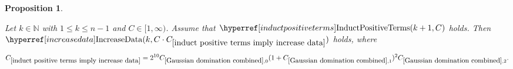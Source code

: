 \documentclass[12pt,reqno]{amsart}
\theoremstyle{plain}
\newtheorem{proposition}[theorem]{Proposition}
\numberwithin{equation}{section}
\theoremstyle{remark}
\newcommand{\uses}[1]{}
\newcommand{\usesdefs}[1]{}
\newcommand{\leanok}{}
\newcommand{\lean}[1]{}
\newcommand{\N}{{\mathbb N}}
\begin{document}
\begin{proposition}
\label{induct positive terms imply increase data}\uses{Gaussian domination combined,Monotonicity K}\usesdefs{multiplicatively spaced monotone sequences,geometric parameters,kernel sequences,sandwich kernel,s multiplier,L multiplier,N multiplier,induct positive terms,increase data}
\lean{Auto.inductPositiveTerms_implies_increaseData}
\leanok
Let $k\in\N$ with $1\le k\le n-1$ and $C\in [1,\infty)$.
Assume that $\InductPositiveTerms{k+1,C}$ holds. Then $\IncreaseData{k,C\cdot C_{\ref{induct positive terms imply increase data}}}$ holds, where
\begin{equation}\label{auto:increase-data-induction-constant-definition}C_{\ref{induct positive terms imply increase data}} = 2^{10} C_{\ref{Gaussian domination combined},0} (1+C_{\ref{Gaussian domination combined},1})^2 C_{\ref{Gaussian domination combined},2}.\end{equation}
\end{proposition}
\end{document}
